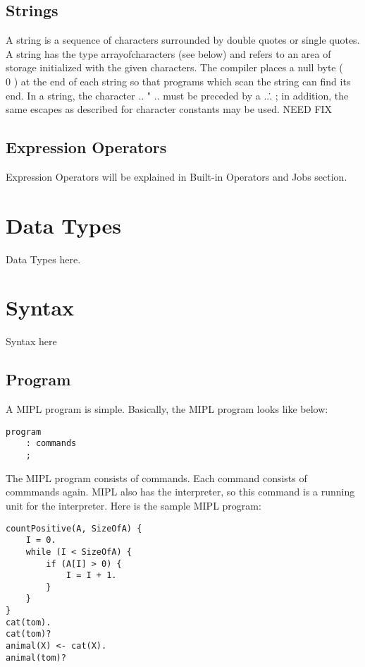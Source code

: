 \documentclass[prodmode,acmtecs]{acmsmall}
\begin{document}
\subsection{Strings}

A string is a sequence of characters surrounded by double quotes or single
quotes.
A string has the type arrayofcharacters
(see below) and refers to an area of storage initialized with the given
characters. The compiler places a null byte ( \\0 ) at the end of each
string so that programs which scan the string can find its end. In a
string, the character ..  " ..  must be preceded by a ..\.. ; in
addition, the same escapes as described for character constants may be used.
NEED FIX

\subsection{Expression Operators}
Expression Operators will be explained in Built-in Operators and Jobs section.

\section{Data Types}

Data Types here.

\section{Syntax}

Syntax here

\subsection{Program}

A MIPL program is simple. Basically, the MIPL program looks like below:

\begin{lstlisting}
program
	: commands
	;
\end{lstlisting}

The MIPL program consists of commands. Each command consists of commmands again. MIPL also has the interpreter, so this command is a running unit for the interpreter. Here is the sample MIPL program:

\begin{lstlisting}
countPositive(A, SizeOfA) {
    I = 0.
    while (I < SizeOfA) {
        if (A[I] > 0) {
            I = I + 1.
        }
    }
}
cat(tom).
cat(tom)?
animal(X) <- cat(X).
animal(tom)?
\end{lstlisting}
\end{document}

